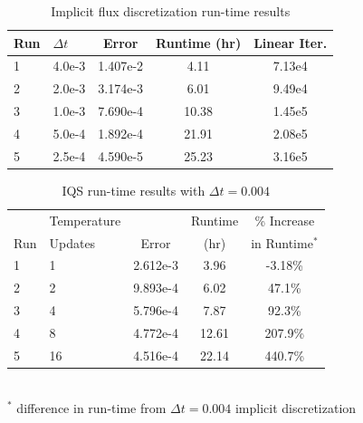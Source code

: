 \documentclass{elsarticle}
\begin{document}
\begin{table}[!htbp]
\begin{center}
\caption{Implicit flux discretization run-time results}
\label{tab:ndiff_lra}
\begin{tabular}{|l|l|ccc|}
\hline
Run  &  $\Delta t$ & Error & Runtime (hr) & Linear Iter.\\
\hline
1	& 4.0e-3	& 1.407e-2 	& 4.11	& 7.13e4	\\
\rowcolor{yellow} 2	& 2.0e-3	& 3.174e-3 	& 6.01	& 9.49e4 	\\
3 	& 1.0e-3 	& 7.690e-4 	& 10.38	& 1.45e5	\\
4 	& 5.0e-4 	& 1.892e-4 	& 21.91	& 2.08e5	\\
5 	& 2.5e-4	& 4.590e-5 	& 25.23	& 3.16e5	\\
\hline
\end{tabular}
\end{center}
\end{table}

\begin{table}[!htbp]
\begin{center}
\caption{IQS run-time results with $\Delta t = 0.004$}
\label{tab:iqs_lra}
\begin{tabular}{|l|l|ccc|}
\hline
	&  Temperature 	&  		& Runtime 	& \% Increase	\\
Run	&  Updates 	& Error & (hr)		& in Runtime$^*$\\
\hline
\rowcolor{yellow} 1	& 1		& 2.612e-3 	& 3.96 	& -3.18\%	\\
2	& 2		& 9.893e-4 	& 6.02	&  47.1\%	\\
3 	& 4 	& 5.796e-4 	& 7.87	&  92.3\%	\\
4 	& 8 	& 4.772e-4 	& 12.61	& 207.9\% 	\\
5 	& 16	& 4.516e-4 	& 22.14	& 440.7\%	\\
\hline
\end{tabular}
\\
$^*$ difference in run-time from $\Delta t = 0.004$ implicit discretization 
\end{center}
\end{table}
\end{document}
